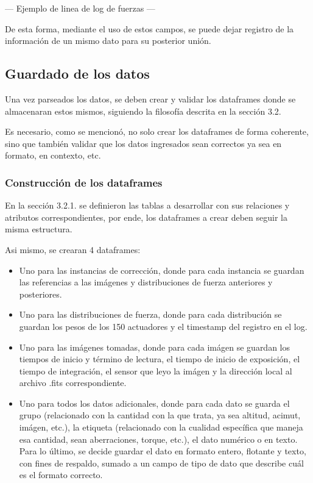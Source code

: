 --- Ejemplo de linea de log de fuerzas ---

De esta forma, mediante el uso de estos campos, se puede dejar registro de la información de un mismo dato para su posterior unión.

\subsection{Guardado de los datos}

Una vez parseados los datos, se deben crear y validar los dataframes donde se almacenaran estos mismos, siguiendo la filosofía descrita en la sección 3.2.

Es necesario, como se mencionó, no solo crear los dataframes de forma coherente, sino que también validar que los datos ingresados sean correctos ya sea en formato, en contexto, etc.

\subsubsection{Construcción de los dataframes}

En la sección 3.2.1. se definieron las tablas a desarrollar con sus relaciones y atributos correspondientes, por ende, los dataframes a crear deben seguir la misma estructura.

Asi mismo, se crearan 4 dataframes:

\begin{itemize}

    \item Uno para las instancias de corrección, donde para cada instancia se guardan las referencias a las imágenes y distribuciones de fuerza anteriores y posteriores.

    \item Uno para las distribuciones de fuerza, donde para cada distribución se guardan los pesos de los 150 actuadores y el timestamp del registro en el log.

    \item Uno para las imágenes tomadas, donde para cada imágen se guardan los tiempos de inicio y término de lectura, el tiempo de inicio de exposición, el tiempo de integración, el sensor que leyo la imágen y la dirección local al archivo .fits correspondiente.

    \item Uno para todos los datos adicionales, donde para cada dato se guarda el grupo (relacionado con la cantidad con la que trata, ya sea altitud, acimut, imágen, etc.), la etiqueta (relacionado con la cualidad específica que maneja esa cantidad, sean aberraciones, torque, etc.), el dato numérico o en texto. Para lo último, se decide guardar el dato en formato entero, flotante y texto, con fines de respaldo, sumado a un campo de tipo de dato que describe cuál es el formato correcto.
    
\end{itemize}

